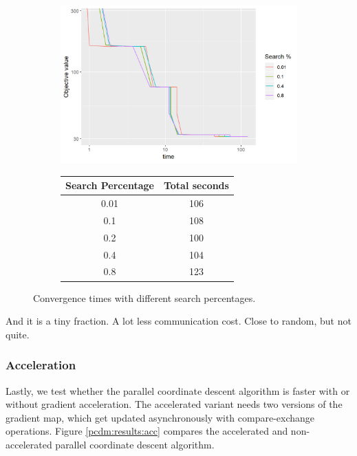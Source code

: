 \begin{figure}[h]
	\centering
	\begin{subfigure}{0.6\linewidth}
		\includegraphics[width=1.0\linewidth]{./chapters/05.pcdm/parameters/searchPercent.png}
	\end{subfigure}
	\begin{subfigure}{0.35\linewidth}
		\begin{tabular}{c | c}
			Search Percentage & Total seconds \\ \hline
			0.01 & 106 \\
			0.1 & 108 \\
			0.2 & 100 \\
			0.4 & 104 \\
			0.8 & 123 \\
		\end{tabular}
	\end{subfigure}
	\caption{Convergence times with different search percentages.}
	\label{pcdm:results:search}
\end{figure}

And it is a tiny fraction. A lot less communication cost. Close to random, but not quite.


\subsubsection{Acceleration}
Lastly, we test whether the parallel coordinate descent algorithm is faster with or without gradient acceleration. The accelerated variant needs two versions of the gradient map, which get updated asynchronously with compare-exchange operations. Figure \ref{pcdm:results:acc} compares the accelerated and non-accelerated parallel coordinate descent algorithm.

